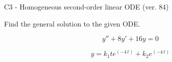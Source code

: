 \begin{exercise}
  \begin{exerciseTitle}C3 - Homogeneous second-order linear ODE (ver. 84)\end{exerciseTitle}
  \begin{exerciseStatement}
    
Find the general solution to the given ODE.

    
\[y''+8y'+16y = 0\]

  \end{exerciseStatement}
  \begin{exerciseAnswer}
    
\[y= k_{1} t e^{\left(-4 \, t\right)} + k_{2} e^{\left(-4 \, t\right)}\]

  \end{exerciseAnswer}
\end{exercise}